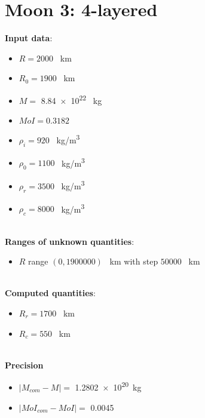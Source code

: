 \documentclass{article}
\begin{document}
\section*{Moon 3: 4-layered}
\textbf{Input data}:
\begin{itemize}
    \item $R = 2000$ \SI{}{km}
    \item $R_0 = 1900$ \SI{}{km}
    \item $M =$ \num{8.84e22} \SI{}{kg}
    \item $MoI = 0.3182$
    \item $\rho_i = 920$ \SI{}{kg/m^3}
    \item $\rho_0 = 1100$ \SI{}{kg/m^3}
    \item $\rho_r = 3500$ \SI{}{kg/m^3}
    \item $\rho_c = 8000$ \SI{}{kg/m^3}
\end{itemize}
\\
\textbf{Ranges of unknown quantities}:
\begin{itemize}
    \item $R$ range $(0,1900000)$ \SI{}{km} with step $50000$ \SI{}{km}
\end{itemize}
\\
\textbf{Computed quantities}:
    \begin{itemize}
        \item $R_r = 1700$ \SI{}{km}
        \item $R_c = 550$ \SI{}{km}
    \end{itemize}    
\\
\textbf{Precision}
\begin{itemize}
    \item $|M_{com}-M| =$ \num{1.2802e+20}\SI{}{kg}
    \item $|MoI_{com}-MoI| =$ \num{0.0045}
\end{itemize}
\end{document}
